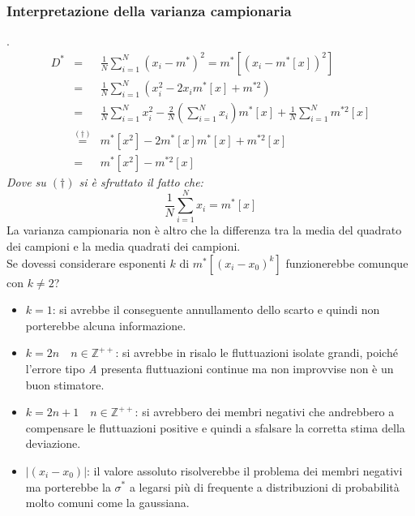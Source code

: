 \documentclass[11pt,a4paper]{book}
\begin{document}
\subsubsection{Interpretazione della varianza campionaria}. \label{Interpretazione della varianza campionaria}
\begin{eqnarray}
D^* & = & \frac{1}{N}\sum\limits_{i = 1}^{N} (x_i - m^*)^2  = m^*[(x_i - m^*[x])^2] \\
& = & \frac{1}{N}\sum\limits_{i = 1}^{N} (x_i^2 -2x_im^*[x]+m^{*2}) \\
& = & \frac{1}{N}\sum\limits_{i = 1}^{N} x_i^2 - \frac{2}{N}\left( \sum\limits_{i = 1}^{N} x_i \right) m^*[x]+ \frac{1}{N}\sum\limits_{i = 1}^{N} m^{*2}[x] \\
& \stackrel{(\dag)}{=} & m^*[x^2]-2m^*[x]m^*[x]+m^{*2}[x] \\
& = & m^*[x^2] - m^{*2}[x]
\end{eqnarray}
\textit{Dove su $ (\dag) $ si è sfruttato il fatto che: \[ \frac{1}{N} \sum\limits_{i = 1}^{N} x_i = m^*[x] \]}
La varianza campionaria non è altro che la differenza tra la media del quadrato dei campioni e la  media quadrati dei campioni.\\
Se dovessi considerare esponenti $ k $ di $m^*[(x_i -x_0)^k]$ funzionerebbe comunque con $ k \neq 2 $? 
\begin{itemize}
\item $ k = 1 $: si avrebbe il conseguente annullamento dello scarto e quindi non porterebbe alcuna informazione.
\item $ k = 2n \quad n\in \mathbb{Z}^{++} $: si avrebbe in risalo le fluttuazioni isolate grandi, poiché l'errore tipo \textit{A} presenta fluttuazioni continue ma non improvvise non è un buon stimatore.
\item $ k = 2n +1 \quad n\in \mathbb{Z}^{++} $: si avrebbero dei membri negativi che andrebbero a compensare le fluttuazioni  positive e quindi a sfalsare la corretta stima della deviazione.
\item $ |(x_i -x_0)| $: il valore assoluto risolverebbe il problema dei membri negativi ma porterebbe la $ \sigma^* $ a legarsi più di frequente a distribuzioni di probabilità molto comuni come la gaussiana.
\end{itemize}
\end{document}
